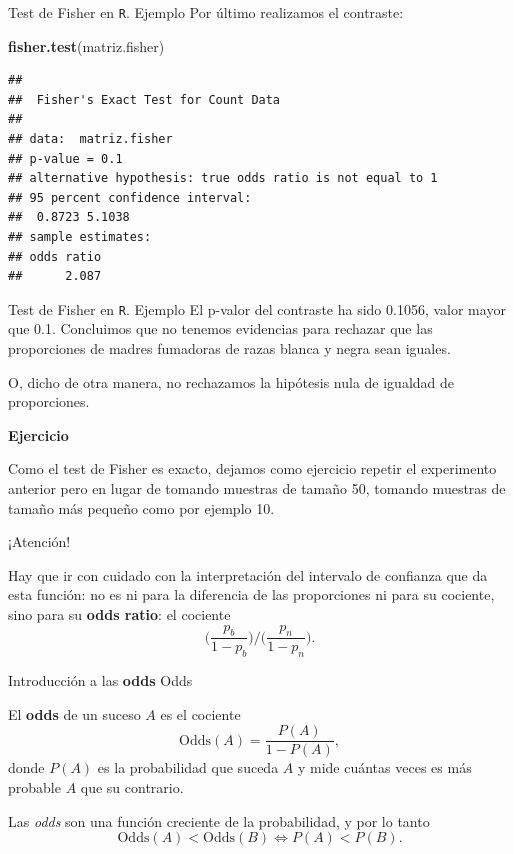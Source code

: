 \documentclass[
  ignorenonframetext,
]{beamer}
\newenvironment{Shaded}{\begin{snugshade}}{\end{snugshade}}
\newcommand{\KeywordTok}[1]{\textcolor[rgb]{0.13,0.29,0.53}{\textbf{#1}}}
\newcommand{\NormalTok}[1]{#1}
\begin{document}
\begin{frame}[fragile]{Test de Fisher en \texttt{R}. Ejemplo}
\protect\hypertarget{test-de-fisher-en-r.-ejemplo-3}{}
Por último realizamos el contraste:

\begin{Shaded}
\begin{Highlighting}[]
\KeywordTok{fisher.test}\NormalTok{(matriz.fisher)}
\end{Highlighting}
\end{Shaded}

\begin{verbatim}
## 
##  Fisher's Exact Test for Count Data
## 
## data:  matriz.fisher
## p-value = 0.1
## alternative hypothesis: true odds ratio is not equal to 1
## 95 percent confidence interval:
##  0.8723 5.1038
## sample estimates:
## odds ratio 
##      2.087
\end{verbatim}
\end{frame}

\begin{frame}{Test de Fisher en \texttt{R}. Ejemplo}
\protect\hypertarget{test-de-fisher-en-r.-ejemplo-4}{}
El p-valor del contraste ha sido 0.1056, valor mayor que 0.1. Concluimos
que no tenemos evidencias para rechazar que las proporciones de madres
fumadoras de razas blanca y negra sean iguales.

O, dicho de otra manera, no rechazamos la hipótesis nula de igualdad de
proporciones.

\textbf{Ejercicio}

Como el test de Fisher es exacto, dejamos como ejercicio repetir el
experimento anterior pero en lugar de tomando muestras de tamaño 50,
tomando muestras de tamaño más pequeño como por ejemplo 10.

¡Atención!

Hay que ir con cuidado con la interpretación del intervalo de confianza
que da esta función: no es ni para la diferencia de las proporciones ni
para su cociente, sino para su \textbf{odds ratio}: el cociente \[
\Big({\frac{p_b}{1-p_b}}\Big)\Big/\Big({\frac{p_n}{1-p_n}}\Big).
\]
\end{frame}

\begin{frame}{Introducción a las \textbf{odds}}
\protect\hypertarget{introducciuxf3n-a-las-odds}{}
Odds

El \textbf{odds} de un suceso \(A\) es el cociente \[
\mbox{Odds}(A)=\frac{P(A)}{1-P(A)},
\] donde \(P(A)\) es la probabilidad que suceda \(A\) y mide cuántas
veces es más probable \(A\) que su contrario.

Las \emph{odds} son una función creciente de la probabilidad, y por lo
tanto \[
\mbox{Odds}(A)<\mbox{Odds}(B)\Longleftrightarrow P(A)<P(B).
\]
\end{frame}
\end{document}
